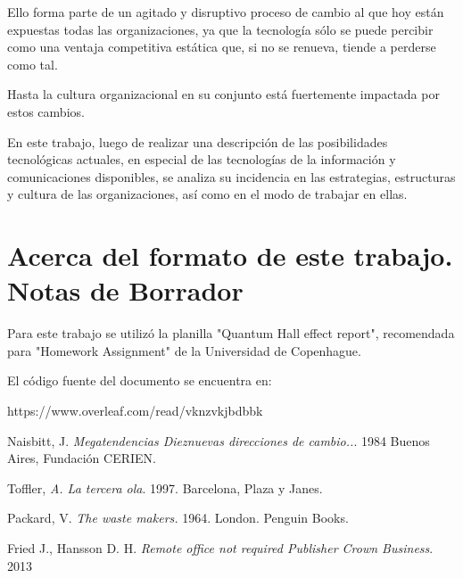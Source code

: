 \documentclass[a4paper, 12pt]{article}
\begin{document}
Ello forma parte de un agitado y disruptivo proceso de cambio al que hoy están expuestas todas las organizaciones, ya que la tecnología sólo se puede percibir como una ventaja competitiva estática que, si no se renueva, tiende a perderse como tal.

Hasta la cultura organizacional en su conjunto está fuertemente impactada por estos cambios.

En este trabajo, luego de realizar una descripción de las posibilidades tecnológicas actuales, en especial de las tecnologías de la información y comunicaciones disponibles, se analiza su incidencia en las estrategias, estructuras y cultura de las organizaciones, así como en el modo de trabajar en ellas.


\section{Acerca del formato de este trabajo. Notas de Borrador}
Para este trabajo se utilizó la planilla "Quantum Hall effect report", recomendada para "Homework Assignment" de la Universidad de Copenhague.

El código fuente del documento se encuentra en:

https://www.overleaf.com/read/vknzvkjbdbbk

\begin{thebibliography}{9}

Naisbitt, J. \emph{Megatendencias Dieznuevas direcciones de cambio..}. 1984 Buenos Aires, Fundación CERIEN.

Toffler, \emph{A. La tercera ola}. 1997. Barcelona, Plaza y Janes. 


Packard, V. \emph{The waste makers.} 1964. London. Penguin Books.


Fried J., Hansson D. H. \emph{Remote office not required Publisher Crown Business}. 2013 
\end{thebibliography}
\end{document}
